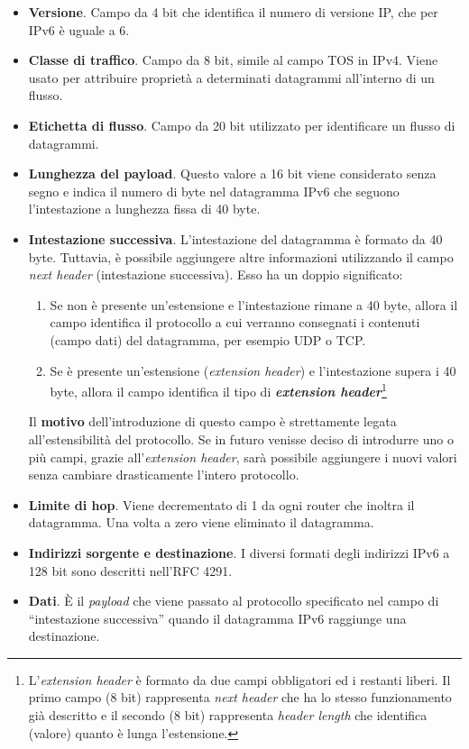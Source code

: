 \documentclass[a4paper]{article}
\newcommand{\dquotes}[1]{``#1''}
\begin{document}
	\begin{itemize}
		\item \textbf{Versione}. Campo da 4 bit che identifica il numero di versione IP, che per IPv6 è uguale a 6.
		
		\item \textbf{Classe di traffico}. Campo da 8 bit, simile al campo \textsf{TOS} in IPv4. Viene usato per attribuire proprietà a determinati datagrammi all'interno di un flusso.
		
		\item \textbf{Etichetta di flusso}. Campo da 20 bit utilizzato per identificare un flusso di datagrammi.
		
		\item \textbf{Lunghezza del payload}. Questo valore a 16 bit viene considerato senza segno e indica il numero di byte nel datagramma IPv6 che seguono l'intestazione a lunghezza fissa di 40 byte.
		
		\item \textbf{Intestazione successiva}. L'intestazione del datagramma è formato da 40 byte. Tuttavia, è possibile aggiungere altre informazioni utilizzando il campo \emph{next header} (intestazione successiva). Esso ha un doppio significato:
		\begin{enumerate}
			\item Se non è presente un'estensione e l'intestazione rimane a 40 byte, allora il campo identifica il protocollo a cui verranno consegnati i contenuti (campo dati) del datagramma, per esempio \textsf{UDP} o \textsf{TCP}.
			
			\item Se è presente un'estensione (\emph{extension header}) e l'intestazione supera i 40 byte, allora il campo identifica il tipo di \textbf{\emph{extension header}}\footnote{L'\emph{extension header} è formato da due campi obbligatori ed i restanti liberi. Il primo campo (8 bit) rappresenta \emph{next header} che ha lo stesso funzionamento già descritto e il secondo (8 bit) rappresenta \emph{header length} che identifica (valore) quanto è lunga l'estensione.}
		\end{enumerate}
		Il \textbf{motivo} dell'introduzione di questo campo è strettamente legata all'estensibilità del protocollo. Se in futuro venisse deciso di introdurre uno o più campi, grazie all'\emph{extension header}, sarà possibile aggiungere i nuovi valori senza cambiare drasticamente l'intero protocollo.
		
		\item \textbf{Limite di hop}. Viene decrementato di 1 da ogni router che inoltra il datagramma. Una volta a zero viene eliminato il datagramma.
		
		\item \textbf{Indirizzi sorgente e destinazione}. I diversi formati degli indirizzi IPv6 a 128 bit sono descritti nell'RFC 4291.
		
		\item \textbf{Dati}. È il \emph{payload} che viene passato al protocollo specificato nel campo di \dquotes{intestazione successiva} quando il datagramma IPv6 raggiunge una destinazione.
	\end{itemize}\newpage
\end{document}
